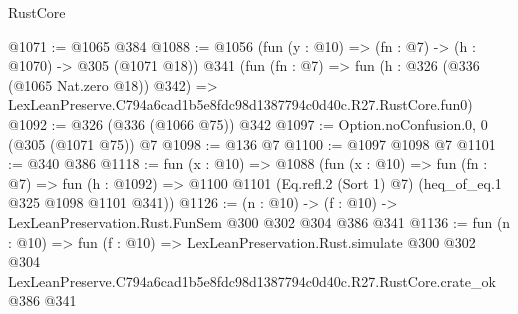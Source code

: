 \begin{lexlean}{RustCore}
\begin{coremodule}
@1071 := @1065 @384
@1088 := @1056
    (fun (y : @10) => (fn : @7) -> (h : @1070) -> @305 (@1071 @18))
    @341
    (fun (fn : @7) =>
    fun (h : @326 (@336 (@1065 Nat.zero @18)) @342) =>
    LexLeanPreserve.C794a6cad1b5e8fdc98d1387794c0d40c.R27.RustCore.fun0)
@1092 := @326 (@336 (@1066 @75)) @342
@1097 := Option.noConfusion.{0, 0} (@305 (@1071 @75)) @7
@1098 := @136 @7
@1100 := @1097 @1098 @7
@1101 := @340 @386
@1118 := fun (x : @10) =>
  @1088
    (fun (x : @10) =>
    fun (fn : @7) =>
    fun (h : @1092) => @1100 @1101 (Eq.refl.{2} (Sort 1) @7) (heq_of_eq.{1} @325 @1098 @1101 @341))
@1126 := (n : @10) -> (f : @10) -> LexLeanPreservation.Rust.FunSem @300 @302 @304 @386 @341
@1136 := fun (n : @10) =>
  fun (f : @10) =>
  LexLeanPreservation.Rust.simulate
    @300
    @302
    @304
    LexLeanPreserve.C794a6cad1b5e8fdc98d1387794c0d40c.R27.RustCore.crate_ok
    @386
    @341
\end{coremodule}
\end{lexlean}
